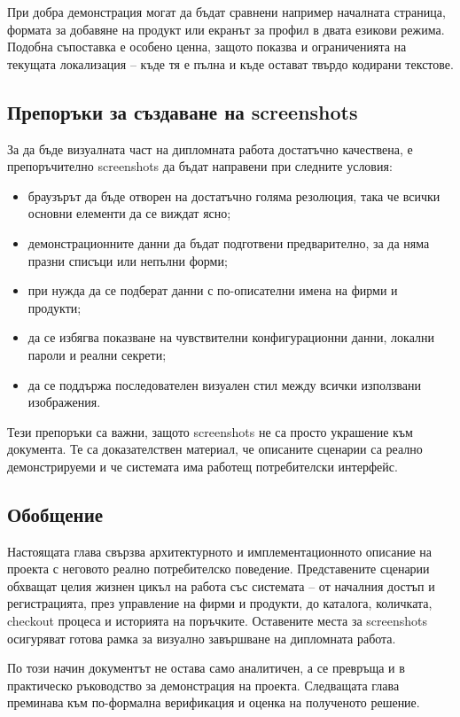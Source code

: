При добра демонстрация могат да бъдат сравнени например началната страница, формата за добавяне на продукт или екранът за профил в двата езикови режима. Подобна съпоставка е особено ценна, защото показва и ограниченията на текущата локализация -- къде тя е пълна и къде остават твърдо кодирани текстове.


\subsection{Препоръки за създаване на screenshots}

За да бъде визуалната част на дипломната работа достатъчно качествена, е препоръчително screenshots да бъдат направени при следните условия:

\begin{itemize}[leftmargin=*]
    \item браузърът да бъде отворен на достатъчно голяма резолюция, така че всички основни елементи да се виждат ясно;
    \item демонстрационните данни да бъдат подготвени предварително, за да няма празни списъци или непълни форми;
    \item при нужда да се подберат данни с по-описателни имена на фирми и продукти;
    \item да се избягва показване на чувствителни конфигурационни данни, локални пароли и реални секрети;
    \item да се поддържа последователен визуален стил между всички използвани изображения.
\end{itemize}

Тези препоръки са важни, защото screenshots не са просто украшение към документа. Те са доказателствен материал, че описаните сценарии са реално демонстрируеми и че системата има работещ потребителски интерфейс.

\subsection{Обобщение}

Настоящата глава свързва архитектурното и имплементационното описание на проекта с неговото реално потребителско поведение. Представените сценарии обхващат целия жизнен цикъл на работа със системата -- от началния достъп и регистрацията, през управление на фирми и продукти, до каталога, количката, checkout процеса и историята на поръчките. Оставените места за screenshots осигуряват готова рамка за визуално завършване на дипломната работа.

По този начин документът не остава само аналитичен, а се превръща и в практическо ръководство за демонстрация на проекта. Следващата глава преминава към по-формална верификация и оценка на полученото решение.

